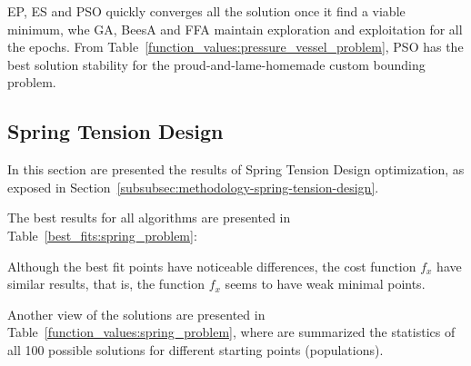 \documentclass[conference]{IEEEtran}
\begin{document}
EP, ES and PSO quickly converges all the solution once it find a viable minimum, whe GA, BeesA and FFA
maintain exploration and exploitation for all the epochs.
From Table~\ref{function_values:pressure_vessel_problem},
PSO has the best solution stability for the proud-and-lame-homemade custom bounding problem.


\subsection{Spring Tension Design}
\label{ssubec:spring_problem}

In this section are presented the results of Spring Tension Design optimization,
as exposed in Section~\ref{subsubsec:methodology-spring-tension-design}.

The best results for all algorithms are presented in Table~\ref{best_fits:spring_problem}:

\begin{table}[H]
\centering
\caption{Best Fits for Spring Tension Design}
\label{best_fits:spring_problem}
\end{table}

Although the best fit points have noticeable differences, the cost function $f_x$ have similar results, that is, the
function $f_x$ seems to have weak minimal points.




Another view of the solutions are presented in Table~\ref{function_values:spring_problem}, where
are summarized the statistics of all 100 possible solutions for different starting points (populations).
\end{document}
